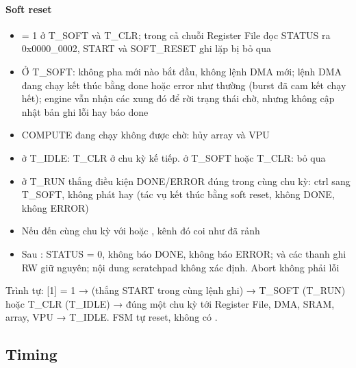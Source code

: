 \documentclass[10pt,a4paper]{article}
\begin{document}
\paragraph{Soft reset}\label{par:8-4}
\begin{itemize}
\item {} = 1 ở T\_SOFT và T\_CLR; trong cả chuỗi Register File đọc STATUS ra 0x0000\_0002, START và SOFT\_RESET ghi lặp bị bỏ qua
\item Ở T\_SOFT: không pha mới nào bắt đầu, không lệnh DMA mới; lệnh DMA đang chạy kết thúc bằng done hoặc error như thường (burst đã cam kết chạy hết); engine vẫn nhận các xung đó để rời trạng thái chờ, nhưng không cập nhật bản ghi lỗi hay báo done
\item COMPUTE đang chạy không được chờ:  hủy array và VPU
\item {} ở T\_IDLE: T\_CLR ở chu kỳ kế tiếp.  ở T\_SOFT hoặc T\_CLR: bỏ qua
\item {} ở T\_RUN thắng điều kiện DONE/ERROR đúng trong cùng chu kỳ: ctrl sang T\_SOFT, không phát  hay  (tác vụ kết thúc bằng soft reset, không DONE, không ERROR)
\item Nếu  đến cùng chu kỳ với  hoặc , kênh đó coi như đã rảnh
\item Sau : STATUS = 0, không báo DONE, không báo ERROR;  và các thanh ghi RW giữ nguyên; nội dung scratchpad không xác định. Abort không phải lỗi
\end{itemize}

\begin{notebox}
Trình tự: [1] = 1 →  (thắng START trong cùng lệnh ghi) → T\_SOFT (T\_RUN) hoặc T\_CLR (T\_IDLE) →  đúng một chu kỳ tới Register File, DMA, SRAM, array, VPU → T\_IDLE. FSM tự reset, không có .
\end{notebox}

\subsection{Timing}\label{sec:9}
\end{document}
